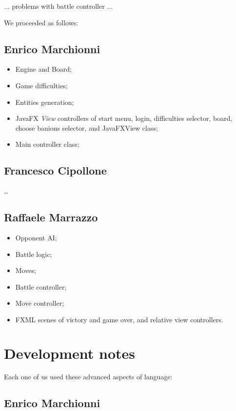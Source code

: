 \documentclass[12pt, a4paper]{report}
\begin{document}
    ... problems with battle controller ...

    We proceeded as follows:

    \subsection*{Enrico Marchionni}

    \begin{itemize}
        \item Engine and Board;
        \item Game difficulties;
        \item Entities generation;
        \item JavaFX \emph{View} controllers of start menu, login, difficulties selector, board, choose banions selector, and JavaFXView class;
        \item Main controller class;
    \end{itemize}

    \subsection*{Francesco Cipollone}

    \dots

    \subsection*{Raffaele Marrazzo}

    \begin{itemize}
        \item Opponent AI;
        \item Battle logic;
        \item Moves;
        \item Battle controller;
        \item Move controller;
        \item FXML scenes of victory and game over, and relative view controllers.
    \end{itemize}

\section{Development notes}

    Each one of us used these advanced aspects of language:

    \subsection*{Enrico Marchionni}
\end{document}

